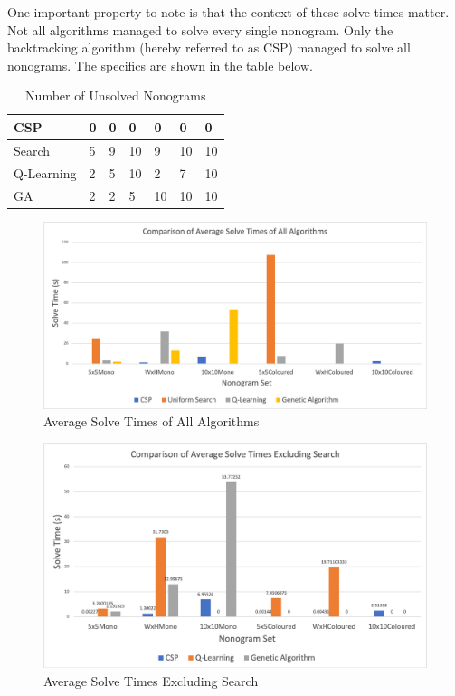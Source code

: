 \documentclass{svproc}
\begin{document}
One important property to note is that the context of these solve  times matter.
Not all algorithms managed to solve every single nonogram.
Only the backtracking algorithm (hereby referred to as CSP) managed to solve all nonograms.
The specifics are shown in the table below.
\begin{table}[h]
    \centering
    \begin{tabularx}{\textwidth}{|m{}||m{}|m{}|m{}|m{}|m{}|m{}|}
        \hline
         CSP & 0 & 0 & 0 & 0 & 0 & 0 \\
         \hline
         Search & 5 & 9 & 10 & 9 & 10 & 10 \\
         \hline
         Q-Learning & 2 & 5 & 10 & 2 & 7 & 10 \\
         \hline
         GA & 2 & 2 & 5 & 10 & 10 & 10 \\
         \hline
    \end{tabularx}
    \caption{Number of Unsolved Nonograms}
    \label{tab:UnsolvedTable}
\end{table}

\begin{figure}[h]
    \centering
    \includegraphics[width=\textwidth]{SolveTimes.png}
    \caption{Average Solve Times of All Algorithms}
    \label{fig:SolveTimes}
\end{figure}

\begin{figure}[h]
    \centering
    \includegraphics[width=\textwidth]{SolveTimesShort.png}
    \caption{Average Solve Times Excluding Search}
    \label{fig:SolveTimesShort}
\end{figure}
\clearpage
\end{document}
